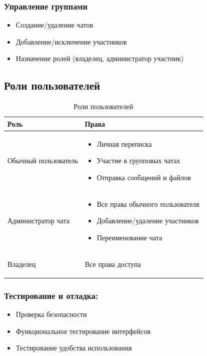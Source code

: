 \subsubsection{Управление группами}
\begin{itemize}
	\item Создание/удаление чатов
	\item Добавление/исключение участников
	\item Назначение ролей (владелец, администратор участник)
\end{itemize}

\subsection{Роли пользователей}

\begin{xltabular}{\textwidth}{|l|X|}
	\caption{Роли пользователей}\label{tab:roles} \\ \hline
	\centrow Роль & \centrow Права \\ \hline
	\endfirsthead
	Обычный пользователь & 
	\begin{itemize}
		\item Личная переписка
		\item Участие в групповых чатах
		\item Отправка сообщений и файлов
	\end{itemize} \\ \hline
	Администратор чата & 
	\begin{itemize}
		\item Все права обычного пользователя
		\item Добавление/удаление участников
		\item Переименование чата
	\end{itemize} \\ \hline
	Владелец &
	\begin{itemize}
		Все права доступа
	\end{itemize} \\ \hline
\end{xltabular}

\subsubsection {Тестирование и отладка:}
\begin{itemize}
	\item Проверка безопасности
	\item Функциональное тестирование интерфейсов
	\item Тестирование удобства использования
\end{itemize}
\newpage

